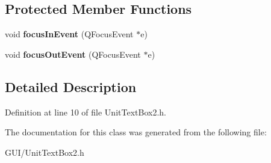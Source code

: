 \subsection*{Protected Member Functions}
\begin{DoxyCompactItemize}
\item 
\mbox{\label{class_unit_text_box2_a05cf5c3b989520c08d3ae655d7a3fd93}} 
void {\bfseries focus\+In\+Event} (Q\+Focus\+Event $\ast$e)
\item 
\mbox{\label{class_unit_text_box2_ae8f19111521d8e351f801a77b9289838}} 
void {\bfseries focus\+Out\+Event} (Q\+Focus\+Event $\ast$e)
\end{DoxyCompactItemize}


\subsection{Detailed Description}


Definition at line 10 of file Unit\+Text\+Box2.\+h.



The documentation for this class was generated from the following file\+:\begin{DoxyCompactItemize}
\item 
G\+U\+I/Unit\+Text\+Box2.\+h\end{DoxyCompactItemize}
